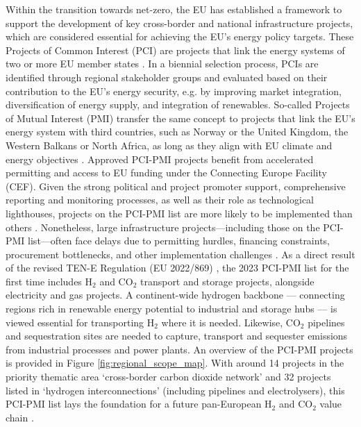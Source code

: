 \documentclass[pdflatex,sn-nature]{sn-jnl}%
\theoremstyle{thmstyleone}%
\theoremstyle{thmstyletwo}%
\theoremstyle{thmstylethree}%
\begin{document}
Within the transition towards net-zero, the EU has established a framework to support the development of key cross-border and national infrastructure projects, which are considered essential for achieving the EU's energy policy targets. These Projects of Common Interest (PCI) are projects that link the energy systems of two or more EU member states \cite{europeancommissionRegulationEUNo2022}. In a biennial selection process, PCIs are identified through regional stakeholder groups and evaluated based on their contribution to the EU's energy security, e.g. by improving market integration, diversification of energy supply, and integration of renewables. So-called Projects of Mutual Interest (PMI) transfer the same concept to projects that link the EU's energy system with third countries, such as Norway or the United Kingdom, the Western Balkans or North Africa, as long as they align with EU climate and energy objectives \cite{europeancommissionCommissionDelegatedRegulation2023}. Approved PCI-PMI projects benefit from accelerated permitting and access to EU funding under the Connecting Europe Facility (CEF). Given the strong political and project promoter support, comprehensive reporting and monitoring processes, as well as their role as technological lighthouses, projects on the PCI-PMI list are more likely to be implemented than others \cite{europeancommission.directorategeneralforenergy.InvestmentNeedsEuropean2025}. Nonetheless, large infrastructure projects—including those on the PCI-PMI list—often face delays due to permitting hurdles, financing constraints, procurement bottlenecks, and other implementation challenges \cite{acerConsolidatedReportProgress2023}. 
As a direct result of the revised TEN-E Regulation (EU 2022/869) \cite{europeanparliamentRegulationEU20222022}, the 2023 PCI-PMI list \cite{europeancommissionCommissionDelegatedRegulation2023,europeancommissionPCIPMITransparencyPlatform2024} for the first time includes H$_2$ and CO$_2$ transport and storage projects, alongside electricity and gas projects. A continent-wide hydrogen backbone --- connecting regions rich in renewable energy potential to industrial and storage hubs --- is viewed essential for transporting H$_2$ where it is needed. Likewise, CO$_2$ pipelines and sequestration sites are needed to capture, transport and sequester emissions from industrial processes and power plants. An overview of the PCI-PMI projects is provided in Figure \ref{fig:regional_scope_map}. With around 14 projects in the priority thematic area `cross-border carbon dioxide network' and 32 projects listed in `hydrogen interconnections' (including pipelines and electrolysers), this PCI-PMI list lays the foundation for a future pan-European H$_2$ and CO$_2$ value chain \cite{europeancommissionAnnexFirstUnion2023}.
\end{document}
